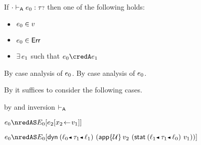 \begin{lemma}\label{A-type-progress}
  If\/ ${\cdot} \vdash_{\mathsf{A}} e_0 : {\tau{\scriptstyle ?}}$
  then one of the following holds:
  \begin{itemize}
    \item
      $e_0 \in v$
    \item
      $e_0 \in \mathsf{Err}$
    \item
      $\exists\,e_1$
      such that\/ $\sexpr_0 \credA \sexpr_1$
  \end{itemize}
\end{lemma}{
  \newcommand{\shortpf}{By case analysis of $\sexpr_0$.}
\begin{lamportproof*}
  \shortpf
\mainproof
  \shortpf

  By  it suffices to consider the following cases.

    \begin{pfproof}
      \qedstep
    \end{pfproof}

    \begin{pfproof}
      \qedstep
    \end{pfproof}

    \begin{pfproof}
        \begin{pfproof}
          by  and inversion $\vdash_{\mathsf{A}}$
        \end{pfproof}
        \begin{pfproof}
          \qedstep
            \begin{pfproof}
              $\sexpr_0 \nredAS \ctx_0[\esubst{\sexpr_2}{\svar_2}{\svalue_1}]$
            \end{pfproof}
        \end{pfproof}
        \begin{pfproof}
          \qedstep
            \begin{pfproof}
              $\sexpr_0 \nredAS \ctx_0[\edynb{\obnd{\sowner_0}{\stype_1}{\sowner_1}}{(\eapp{\tdyn}{\svalue_2}{(\estab{\obnd{\sowner_1}{\stype_1}{\sowner_0}}{\svalue_1})})}]$
            \end{pfproof}
        \end{pfproof}
    \end{pfproof}


\end{lamportproof*}}

